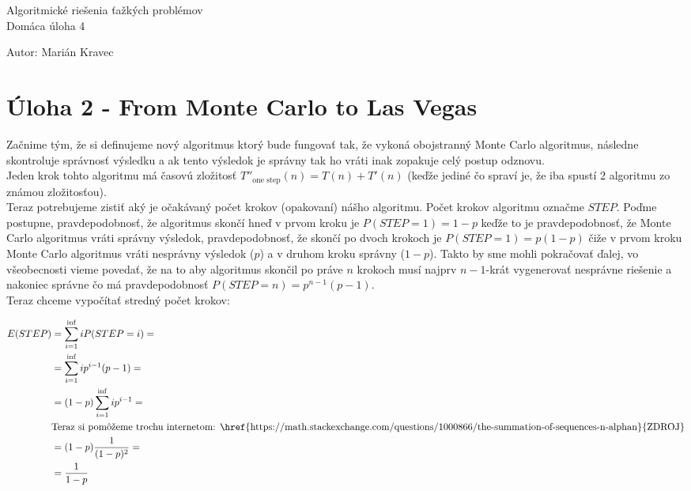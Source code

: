 \documentclass[a4paper]{article}
\begin{document}
 
	
\pagestyle{plain}

\begin{center}
	\sc\large
	Algoritmické riešenia ťažkých problémov\\
	Domáca úloha 4
\end{center}

Autor: Marián Kravec

\section{Úloha 2 - From Monte Carlo to Las Vegas}

Začnime tým, že si definujeme nový algoritmus ktorý bude fungovať tak, že vykoná obojstranný Monte Carlo algoritmus, následne skontroluje správnosť výsledku a ak tento výsledok je správny tak ho vráti inak zopakuje celý postup odznovu.
\\

Jeden krok tohto algoritmu má časovú zložitosť $T''_{\text{one step}}(n) = T(n) + T'(n)$ (keďže jediné čo spraví je, že iba spustí 2 algoritmu zo známou zložitosťou).
\\

Teraz potrebujeme zistiť aký je očakávaný počet krokov (opakovaní) nášho algoritmu. Počet krokov algoritmu označme $STEP$. Poďme postupne, pravdepodobnosť, že algoritmus skončí hneď v prvom kroku je $P(STEP=1)=1-p$ keďže to je pravdepodobnosť, že Monte Carlo algoritmus vráti správny výsledok, pravdepodobnosť, že skončí po dvoch krokoch je $P(STEP=1)=p(1-p)$ čiže v prvom kroku Monte Carlo algoritmus vráti nesprávny výsledok ($p$) a v druhom kroku správny ($1-p$). Takto by sme mohli pokračovať ďalej, vo všeobecnosti vieme povedať, že na to aby algoritmus skončil po práve $n$ krokoch musí najprv $n-1$-krát vygenerovať nesprávne riešenie a nakoniec správne čo má pravdepodobnosť $P(STEP=n)=p^{n-1}(p-1)$.
\\

Teraz chceme vypočítať stredný počet krokov:

\begin{align*}
	E(STEP) &= \sum_{i=1}^{\inf} iP(STEP=i) =\\
	&= \sum_{i=1}^{\inf} ip^{i-1}(p-1) =\\
	&= (1-p)\sum_{i=1}^{\inf} ip^{i-1} =\\
	&\text{Teraz si pomôžeme trochu internetom: \href{https://math.stackexchange.com/questions/1000866/the-summation-of-sequences-n-alphan}{ZDROJ}}\\
	&= (1-p)\frac{1}{(1-p)^2} =\\
	&= \frac{1}{1-p}
\end{align*}
\end{document}
